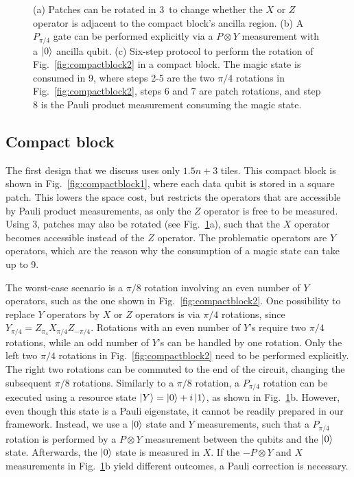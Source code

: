 \documentclass[prx,aps,letterpaper,twocolumn,allowfontchageintitle=true,accepted=2019-02-01]{quantumarticle}
\begin{document}
\begin{figure}[t!]
\centering
\def\svgwidth{0.98\linewidth}

\caption{(a) Patches can be rotated in 3\clock \ to change whether the $X$ or $Z$ operator is adjacent to the compact block's ancilla region.  (b) A $P_{\pi/4}$ gate can be performed explicitly via a $P \otimes Y$ measurement with a $\ket{0}$ ancilla qubit. (c) Six-step protocol to perform the rotation of Fig.~\ref{fig:compactblock2} in a compact block. The magic state is consumed in 9\clock, where steps 2-5 are the two $\pi/4$ rotations in Fig.~\ref{fig:compactblock2}, steps 6 and 7 are patch rotations, and step 8 is the Pauli product measurement consuming the magic state.}
\label{fig:compactblock3}
\end{figure}

\subsection{Compact block}

The first design that we discuss uses only $1.5n+3$ tiles. This compact block is shown in Fig.~\ref{fig:compactblock1}, where each data qubit is stored in a square patch. This lowers the space cost, but restricts the operators that are accessible by Pauli product measurements, as only the $Z$ operator is free to be measured. Using 3\clock, patches may also be rotated (see Fig.~\ref{fig:compactblock3}a), such that the $X$ operator becomes accessible instead of the $Z$ operator. The problematic operators are $Y$ operators, which are the reason why the consumption of a magic state can take up to 9\clock.




The worst-case scenario is a $\pi/8$ rotation involving an even number of $Y$ operators, such as the one shown in Fig.~\ref{fig:compactblock2}. One possibility to replace $Y$ operators by $X$ or $Z$ operators is via $\pi/4$ rotations, since \linebreak $Y_{\pi/4} = Z_{\pi_4} X_{\pi/4} Z_{-\pi/4}$. Rotations with an even number of $Y$'s require two $\pi/4$ rotations, while an odd number of $Y$'s can be handled by one rotation. Only the left two $\pi/4$ rotations in Fig.~\ref{fig:compactblock2} need to be performed explicitly. The right two rotations can be commuted to the end of the circuit, changing the subsequent $\pi/8$ rotations. Similarly to a $\pi/8$ rotation, a $P_{\pi/4}$ rotation can be executed using a resource state $\ket{Y} = \ket{0} + i\ket{1}$, as shown in Fig.~\ref{fig:compactblock3}b. However, even though this state is a Pauli eigenstate, it cannot be readily prepared in our framework. Instead, we use a $\ket{0}$ state and $Y$ measurements, such that a $P_{\pi/4}$ rotation is performed by a $P\otimes Y$ measurement between the qubits and the $\ket{0}$ state. Afterwards, the $\ket{0}$ state is measured in $X$. If the $-P \otimes Y$ and $X$ measurements in Fig.~\ref{fig:compactblock3}b yield different outcomes, a Pauli correction is necessary.
\end{document}
